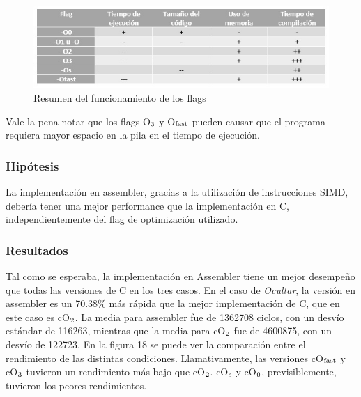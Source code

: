 \documentclass[a4paper]{article}
\begin{document}
\begin{figure}[!htb]
  \begin{center}
	\includegraphics[scale=0.7]{img/flags.jpg}
	\caption{Resumen del funcionamiento de los flags}
  \end{center}
\end{figure}

Vale la pena notar que los flags O$\textsubscript{3}$ y O$\textsubscript{fast}$ pueden causar que el programa requiera mayor espacio en la pila en el tiempo de ejecución.

\subsubsection{Hipótesis}
La implementación en assembler, gracias a la utilización de instrucciones SIMD, debería tener una mejor performance que la implementación en C, independientemente del flag de optimización utilizado.

\subsubsection{Resultados}
Tal como se esperaba, la implementación en Assembler tiene un mejor desempeño que todas las versiones de C en los tres casos.
En el caso de \textit{Ocultar}, la versión en assembler es un 70.38\% más rápida que la mejor implementación de C, que en este caso es cO$\textsubscript{2}$. La media para assembler fue de 1362708 ciclos, con un desvío estándar de 116263, mientras que la media para cO$\textsubscript{2}$ fue de 4600875, con un desvío de 122723. En la figura 18 se puede ver la comparación entre el rendimiento de las distintas condiciones. Llamativamente, las versiones cO$\textsubscript{fast}$ y cO$\textsubscript{3}$ tuvieron un rendimiento más bajo que cO$\textsubscript{2}$. cO$\textsubscript{s}$ y cO$\textsubscript{0}$, previsiblemente, tuvieron los peores rendimientos.
\end{document}
